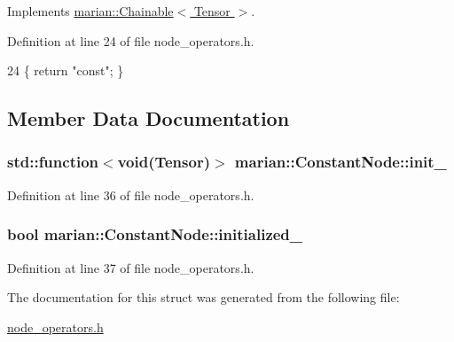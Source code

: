 Implements \hyperlink{classmarian_1_1Chainable_a2b7a5cbdac7a7d3bd7d781a6ff148fc3}{marian\+::\+Chainable$<$ Tensor $>$}.



Definition at line 24 of file node\+\_\+operators.\+h.


\begin{DoxyCode}
24 \{ \textcolor{keywordflow}{return} \textcolor{stringliteral}{"const"}; \}
\end{DoxyCode}


\subsection{Member Data Documentation}
\subsubsection[{\texorpdfstring{init\+\_\+}{init_}}]{\setlength{\rightskip}{0pt plus 5cm}std\+::function$<$void({\bf Tensor})$>$ marian\+::\+Constant\+Node\+::init\+\_\+\hspace{0.3cm}{\ttfamily [private]}}\hypertarget{structmarian_1_1ConstantNode_aa7443e15d4a1980a9c67e35c6d9d3ee8}{}\label{structmarian_1_1ConstantNode_aa7443e15d4a1980a9c67e35c6d9d3ee8}


Definition at line 36 of file node\+\_\+operators.\+h.

\subsubsection[{\texorpdfstring{initialized\+\_\+}{initialized_}}]{\setlength{\rightskip}{0pt plus 5cm}bool marian\+::\+Constant\+Node\+::initialized\+\_\+\hspace{0.3cm}{\ttfamily [private]}}\hypertarget{structmarian_1_1ConstantNode_aa8f7c252c751f5e2ad3fa797f679338b}{}\label{structmarian_1_1ConstantNode_aa8f7c252c751f5e2ad3fa797f679338b}


Definition at line 37 of file node\+\_\+operators.\+h.



The documentation for this struct was generated from the following file\+:\begin{DoxyCompactItemize}
\item 
\hyperlink{node__operators_8h}{node\+\_\+operators.\+h}\end{DoxyCompactItemize}
